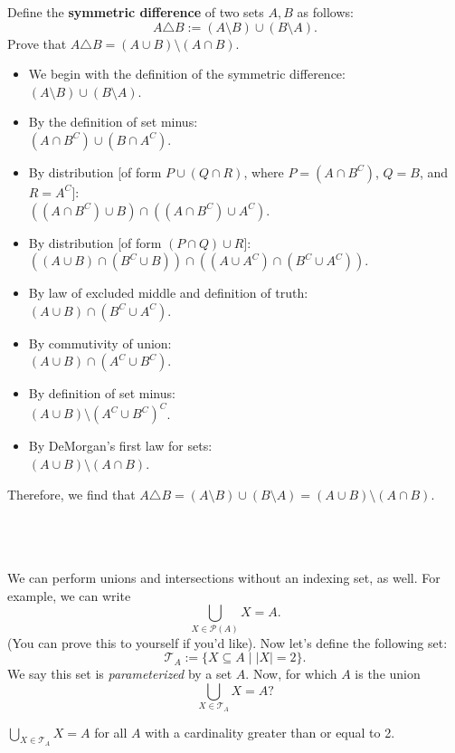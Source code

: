 \documentclass{article}
\begin{document}
\begin{problem*}
Define the \textbf{symmetric difference} of two sets $A,B$ as follows: \[A\triangle B:= (A\setminus B)\cup (B\setminus A).\] Prove that $A\triangle B=(A\cup B)\setminus (A\cap B)$. 
\end{problem*}

\begin{itemize}
    \item We begin with the definition of the symmetric difference: \\ 
    $(A \setminus B) \cup (B \setminus A)$.
    \item By the definition of set minus: \\
    $(A \cap B^C) \cup (B \cap A^C)$.
    \item By distribution [of form $P \cup (Q \cap R)$, where $P=(A \cap B^C)$, $Q=B$, and $R=A^C$]: \\
    $((A \cap B^C) \cup B) \cap ((A \cap B^C) \cup A^C)$.
    \item By distribution [of form $(P\cap Q) \cup R$]: \\
    $((A \cup B)\cap(B^C \cup B))\cap((A \cup A^C)\cap(B^C \cup A^C))$.
    \item By law of excluded middle and definition of truth: \\
    $(A \cup B) \cap (B^C \cup A^C)$.
    \item By commutivity of union: \\
    $(A \cup B) \cap (A^C \cup B^C)$.
    \item By definition of set minus: \\
    $(A \cup B) \setminus (A^C \cup B^C)^C$.
    \item By DeMorgan's first law for sets: \\
    $(A \cup B) \setminus (A \cap B)$.
\end{itemize}

Therefore, we find that $A\triangle B = (A\setminus B)\cup (B\setminus A) = (A \cup B) \setminus (A \cap B)$. \quad \qedsymbol

\
\hline
\section{}
\begin{problem*}
We can perform unions and intersections without an indexing set, as well. For example, we can write \[\bigcup_{X \in \mathcal{P}(A)} X = A.\] (You can prove this to yourself if you'd like). Now let's define the following set: \[\mathcal{T}_A := \{X \subseteq A \mid |X| = 2\}.\] We say this set is \textit{parameterized} by a set $A$. Now, for which $A$ is the union \[\bigcup_{X \in \mathcal{T}_A} X = A?\]
\end{problem*}

$\bigcup \limits_{X \in \mathcal{T}_A} X = A$ for all $A$ with a cardinality greater than or equal to 2.





\end{document}
